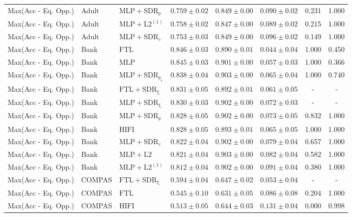 \begin{table}[htbp]
\begin{tabular}{lllccccc}
Max(Acc - Eq. Opp.) & Adult & $\mathrm{MLP+SDR_{\rho}}$ & $0.759 \pm0.02$ & $0.849 \pm0.00$ & $0.090 \pm0.02$ & 0.231 & 1.000 \\
Max(Acc - Eq. Opp.) & Adult & $\mathrm{MLP+L2^{(1)}}$ & $0.758 \pm0.02$ & $0.847 \pm0.00$ & $0.089 \pm0.02$ & 0.215 & 1.000 \\
Max(Acc - Eq. Opp.) & Adult & $\mathrm{MLP+SDR_{\tau}}$ & $0.753 \pm0.03$ & $0.849 \pm0.00$ & $0.096 \pm0.02$ & 0.149 & 1.000 \\
Max(Acc - Eq. Opp.) & Bank & $\mathrm{FTL}$ & $0.846 \pm0.03$ & $0.890 \pm0.01$ & $0.044 \pm0.04$ & 1.000 & 0.450 \\
Max(Acc - Eq. Opp.) & Bank & $\mathrm{MLP}$ & $0.845 \pm0.03$ & $0.901 \pm0.00$ & $0.057 \pm0.03$ & 1.000 & 0.366 \\
Max(Acc - Eq. Opp.) & Bank & $\mathrm{MLP+SDR_{\rho_s}}$ & $0.838 \pm0.04$ & $0.903 \pm0.00$ & $0.065 \pm0.04$ & 1.000 & 0.740 \\
Max(Acc - Eq. Opp.) & Bank & $\mathrm{FTL+SDR_{\xi}}$ & $0.831 \pm0.05$ & $0.892 \pm0.01$ & $0.061 \pm0.05$ & - & - \\
Max(Acc - Eq. Opp.) & Bank & $\mathrm{MLP+SDR_{\xi}}$ & $0.830 \pm0.03$ & $0.902 \pm0.00$ & $0.072 \pm0.03$ & - & - \\
Max(Acc - Eq. Opp.) & Bank & $\mathrm{MLP+SDR_{\rho}}$ & $0.828 \pm0.05$ & $0.902 \pm0.00$ & $0.073 \pm0.05$ & 0.832 & 1.000 \\
Max(Acc - Eq. Opp.) & Bank & $\mathrm{HIFI}$ & $0.828 \pm0.05$ & $0.893 \pm0.01$ & $0.065 \pm0.05$ & 1.000 & 1.000 \\
Max(Acc - Eq. Opp.) & Bank & $\mathrm{MLP+SDR_{\tau}}$ & $0.822 \pm0.04$ & $0.902 \pm0.00$ & $0.079 \pm0.04$ & 0.657 & 1.000 \\
Max(Acc - Eq. Opp.) & Bank & $\mathrm{MLP+L2}$ & $0.821 \pm0.04$ & $0.903 \pm0.00$ & $0.082 \pm0.04$ & 0.582 & 1.000 \\
Max(Acc - Eq. Opp.) & Bank & $\mathrm{MLP+L2^{(1)}}$ & $0.812 \pm0.04$ & $0.902 \pm0.00$ & $0.091 \pm0.04$ & 0.380 & 1.000 \\
Max(Acc - Eq. Opp.) & COMPAS & $\mathrm{FTL+SDR_{\xi}}$ & $0.594 \pm0.04$ & $0.647 \pm0.02$ & $0.053 \pm0.04$ & - & - \\
Max(Acc - Eq. Opp.) & COMPAS & $\mathrm{FTL}$ & $0.545 \pm0.10$ & $0.631 \pm0.05$ & $0.086 \pm0.08$ & 0.204 & 1.000 \\
Max(Acc - Eq. Opp.) & COMPAS & $\mathrm{HIFI}$ & $0.513 \pm0.05$ & $0.644 \pm0.03$ & $0.131 \pm0.04$ & 0.000 & 0.998 \\

\end{tabular}
\end{table}
